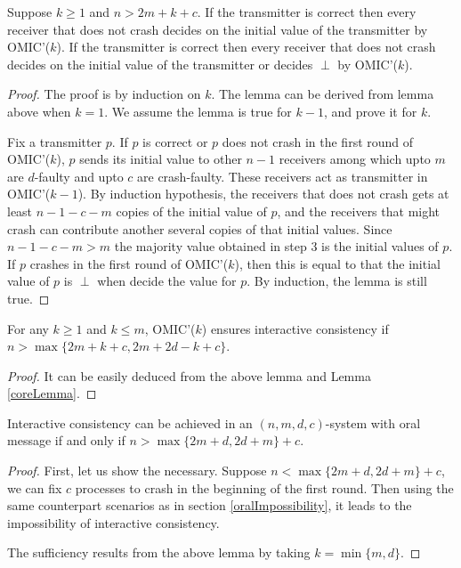 \begin{lemma}
  Suppose $k \geqslant 1$ and $n>2m+k+c$. If the transmitter is correct then
  every receiver that does not crash decides on the initial value of the
  transmitter by OMIC'($k$). If the transmitter is correct then every receiver
  that does not crash decides on the initial value of the transmitter or
  decides $\perp$ by OMIC'($k$).
\end{lemma}

\begin{proof}
  The proof is by induction on $k$. The lemma can be derived from lemma above
  when $k=1$. We assume the lemma is true for $k-1$, and prove it for $k$.
  
  Fix a transmitter $p$. If $p$ is correct or $p$ does not crash in the first
  round of OMIC'($k$), $p$ sends its initial value to other $n-1$ receivers
  among which upto $m$ are $d$-faulty and upto $c$ are crash-faulty. These
  receivers act as transmitter in OMIC'($k-1$). By induction hypothesis, the
  receivers that does not crash gets at least $n-1-c-m$ copies of the initial
  value of $p$, and the receivers that might crash can contribute another
  several copies of that initial values. Since $n-1-c-m>m$ the majority value
  obtained in step $3$ is the initial values of $p$. If $p$ crashes in the
  first round of OMIC'($k$), then this is equal to that the initial value of
  $p$ is $\perp$ when decide the value for $p$. By induction, the lemma is
  still true.
\end{proof}

\begin{lemma}
  For any $k \geqslant 1$ and $k \leqslant m$, OMIC'($k$) ensures interactive
  consistency if $n> \max \{ 2m+k+c,2m+2d-k+c \}$.
\end{lemma}

\begin{proof}
  It can be easily deduced from the above lemma and Lemma \ref{coreLemma}.
\end{proof}

\begin{theorem}
  Interactive consistency can be achieved in an $( n,m,d,c )$-system with oral
  message if and only if $n> \max \{ 2m+d,2d+m \} +c$.
\end{theorem}

\begin{proof}
  First, let us show the necessary. Suppose $n< \max \{ 2m+d,2d+m \} +c$, we
  can fix $c$ processes to crash in the beginning of the first round. Then
  using the same counterpart scenarios as in section \ref{oralImpossibility}, it leads to the
  impossibility of interactive consistency.
  
  The sufficiency results from the above lemma by taking $k= \min \{ m,d \}$.
\end{proof}
\fi

